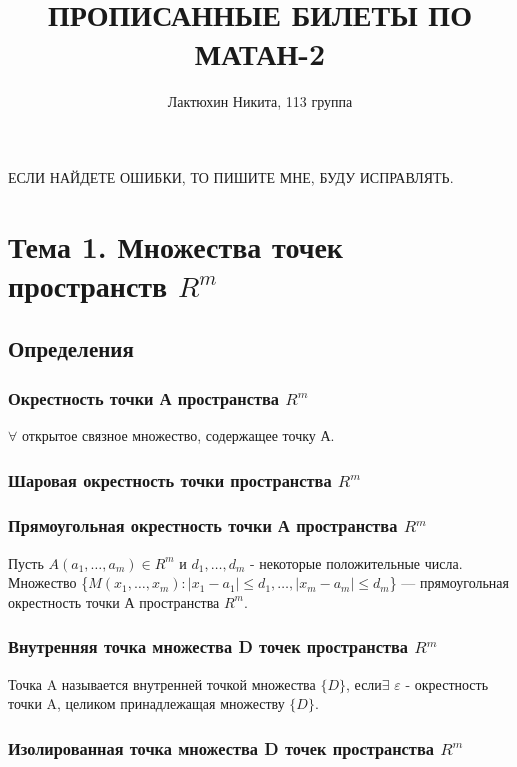 \documentclass[a4paper, 12pt]{article}
\title{ПРОПИСАННЫЕ БИЛЕТЫ ПО МАТАН-2}
\author{Лактюхин Никита, 113 группа}
\renewcommand{\epsilon}{\varepsilon}
\newcommand{\Rm}{\texorpdfstring{$R^m$}{Lg}}
\def\newline{}%
\begin{document}
\fontsize{14pt}{20pt}\selectfont
\maketitle
ЕСЛИ НАЙДЕТЕ ОШИБКИ, ТО ПИШИТЕ МНЕ, БУДУ ИСПРАВЛЯТЬ.
\newpage
\tableofcontents
\fontsize{14pt}{20pt}\selectfont
\newpage
    \section{Тема 1. Множества точек пространств \Rm}
        \subsection{Определения}
            \subsubsection{Окрестность точки А пространства \Rm}

            $\forall$ открытое связное множество, содержащее точку А.

            \subsubsection{Шаровая окрестность точки пространства \Rm}

            \subsubsection{Прямоугольная окрестность точки А пространства \Rm}

            Пусть $A(a_1,\ldots, a_m) \in R^m$ и $d_1, \ldots , d_m$ - некоторые
            положительные числа. Множество \{$M(x_1, \ldots, x_m):|x_1 -a_1|\leq d_1, \ldots, |x_m - a_m| \leq d_m$\}
            --- прямоугольная окрестность точки А пространства $R^m$.

            \subsubsection{Внутренняя точка множества D точек пространства \Rm}

            Точка A называется внутренней точкой множества $\{D\}$,
            если\newline $\exists$ $\epsilon$ - окрестность точки A, целиком
            принадлежащая множеству $\{D\}$.

            \subsubsection{Изолированная точка множества D точек пространства \Rm}
\end{document}

